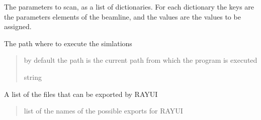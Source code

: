 \documentclass[letterpaper,10pt,english]{sphinxmanual}
\begin{document}
\begin{fulllineitems}
\begin{fulllineitems}
\end{fulllineitems}


\begin{fulllineitems}
\label{\detokenize{index:raypyng.simulate.Simulate.params}}
\pysigstartsignatures
{}
\pysigstopsignatures
\sphinxAtStartPar
The parameters to scan, as a list of dictionaries.
For each dictionary the keys are the parameters elements of the beamline, and the values are the
values to be assigned.

\end{fulllineitems}


\begin{fulllineitems}
\label{\detokenize{index:raypyng.simulate.Simulate.path}}
\pysigstartsignatures
{}
\pysigstopsignatures
\sphinxAtStartPar
The path where to execute the simlations
\begin{quote}\begin{description}
\sphinxAtStartPar
by default the path is the current path from which
the program is executed

\sphinxAtStartPar
string

\end{description}\end{quote}

\end{fulllineitems}


\begin{fulllineitems}
\label{\detokenize{index:raypyng.simulate.Simulate.possible_exports}}
\pysigstartsignatures
{}
\pysigstopsignatures
\sphinxAtStartPar
A list of the files that can be exported by RAY\sphinxhyphen{}UI
\begin{quote}\begin{description}
\sphinxAtStartPar
list of the names of the possible exports for RAY\sphinxhyphen{}UI


\end{description}
\end{quote}
\end{fulllineitems}
\end{fulllineitems}
\end{document}
